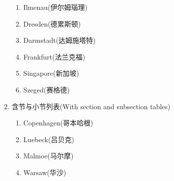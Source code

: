\documentclass{beamer}
\begin{document}
\begin{frame}[allowframebreaks]
\begin{enumerate}[I]
\begin{enumerate}
\item Ilmenau(伊尔姆瑙理)
\item Dresden(德累斯顿)
\item Darmstadt(达姆施塔特)
\item Frankfurt(法兰克福)
\item Singapore(新加坡)
\item Szeged(赛格德)
\end{enumerate}
\item 含节与小节列表(With section and subsection tables)
\begin{enumerate}
\item Copenhagen(哥本哈根)
\item Luebeck(吕贝克)
\item Malmoe(马尔摩)
\item Warsaw(华沙)
\end{enumerate}
\end{enumerate}
\end{frame}

\end{document}
